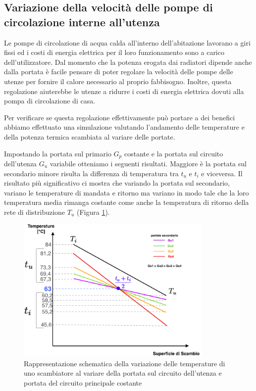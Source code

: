 \documentclass[laurea,oneside,11pt]{USiena_tesiLM3}
\begin{document}
\subsection{Variazione della velocità delle pompe di circolazione interne all'utenza}


Le pompe di circolazione di acqua calda all'interno dell'abitazione lavorano a giri fissi ed i costi di energia elettrica per il loro funzionamento sono a carico dell'utilizzatore. Dal momento che la potenza erogata dai radiatori dipende anche dalla portata è facile pensare di poter  regolare la velocità delle pompe delle utenze per fornire il calore necessario al proprio fabbisogno. Inoltre, questa regolazione aiuterebbe le utenze a ridurre i costi di energia elettrica dovuti alla pompa di circolazione di casa.

Per verificare se questa regolazione effettivamente può portare a dei benefici abbiamo effettuato una simulazione valutando  l’andamento delle temperature e della potenza termica scambiata al variare delle portate.

Impostando la portata sul primario $G_p$ costante e la portata sul circuito dell'utenza $G_u$ variabile otteniamo i seguenti risultati.
Maggiore è la portata sul secondario minore risulta la differenza di temperatura tra $t_u$ e $t_i$ e viceversa. Il risultato più significativo ci mostra che variando la portata sul secondario, variano le temperature di mandata e ritorno ma variano in
modo tale che la loro temperatura media rimanga costante come anche la temperatura di ritorno della rete di distribuzione $T_u$ (Figura \ref{fig:pompa_var_utenza}).

\begin{figure}[!ht]
\centering
\includegraphics[width=0.85\textwidth]{figure/pompa_var_utenza} 
\caption{Rappresentazione schematica della variazione delle temperature di uno scambiatore al variare della portata sul circuito dell'utenza e portata del circuito principale costante}
\label{fig:pompa_var_utenza}
\end{figure}
\end{document}
